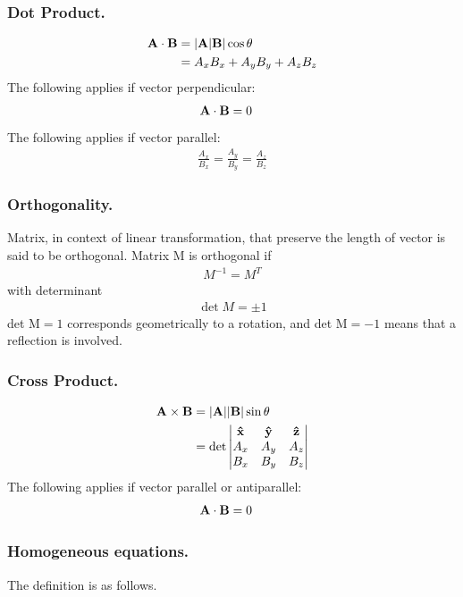\documentclass[../../../main.tex]{subfiles}
\begin{document}
\subsubsection{Dot Product.}
\begin{align*}
	\mathbf{A}\cdot\mathbf{B} & =|\mathbf{A}|\mathbf{B}|\cos\theta    \\
	          & =A_xB_x+A_yB_y+A_zB_z
\end{align*}
The following applies if vector perpendicular:
\begin{align*}
	\mathbf{A}\cdot\mathbf{B} & =0
\end{align*}
The following applies if vector parallel:
\begin{align*}
	\frac{A_x}{B_x}=\frac{A_y}{B_y}=\frac{A_z}{B_z}
\end{align*}

\subsubsection{Orthogonality.}
Matrix, in context of linear transformation, that preserve the length of vector is said to be orthogonal.
Matrix M is orthogonal if
\begin{align*}
	M^{-1}=M^T
\end{align*}
with determinant
\begin{align*}
	\det M = \pm 1
\end{align*}
det $\text{M} = 1$ corresponds geometrically to a rotation, and det $\text{M} = -1$ means that a reflection is involved.

\subsubsection{Cross Product.}
\begin{align*}
	\mathbf{A}\times\mathbf{B} & =|\mathbf{A}||\mathbf{B}|\sin\theta  \\
	           & =\det\begin{vmatrix}
		                  \mathbf{\hat{x}}  & \mathbf{\hat{y}}  & \mathbf{\hat{z}}  \\
		                  A_x & A_y & A_z \\
		                  B_x & B_y & B_z
	                  \end{vmatrix}
\end{align*}
The following applies if vector parallel or antiparallel:
\begin{align*}
	\mathbf{A}\cdot\mathbf{B} & =0
\end{align*}

\subsubsection{Homogeneous equations.}
The definition is as follows.
\end{document}
